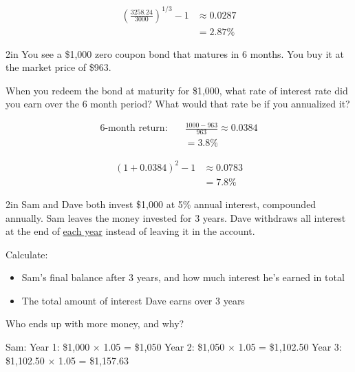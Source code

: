 \documentclass[12pt]{exam}
\begin{document}
\begin{questions}
\begin{solution}
    \begin{align*}
      \left(\frac{3258.24}{3000}\right)^{1/3} - 1 &\approx 0.0287 \\
      &= 2.87\%
    \end{align*}
  \end{solution}

  \begin{problem}[10]{2in}
    You see a \$1,000 zero coupon bond that matures in 6 months.  You buy it at the market
    price of \$963.

    When you redeem the bond at maturity for \$1,000, what rate of interest rate
    did you earn over the 6 month period?  What would that rate be if you annualized it?
  \end{problem}
  \begin{solution}
    \begin{align*}
      \text{6-month return:} \quad & \frac{1000 - 963}{963} \approx 0.0384 \\
      &= 3.8\%
    \end{align*}

    \vspace{0.5\baselineskip}

    \begin{align*}
      (1 + 0.0384)^2 - 1 &\approx 0.0783 \\
      &= 7.8\%
    \end{align*}
  \end{solution}

  \begin{problem}[10]{2in}
    Sam and Dave both invest \$1{,}000 at 5\% annual interest, compounded annually.
    Sam leaves the money invested for 3 years.
    Dave withdraws all interest at the end of \underline{each year} instead of leaving it in the account.

    Calculate:
    \begin{itemize}
      \item Sam’s final balance after 3 years, and how much interest he's earned in total
      \item The total amount of interest Dave earns over 3 years
    \end{itemize}
    Who ends up with more money, and why?
  \end{problem}
  \begin{solution}
    Sam:
    Year 1: \$1{,}000 $\times$ 1.05 = \$1{,}050
    Year 2: \$1{,}050 $\times$ 1.05 = \$1{,}102.50
    Year 3: \$1{,}102.50 $\times$ 1.05 = \$1{,}157.63


\end{solution}
\end{questions}
\end{document}
